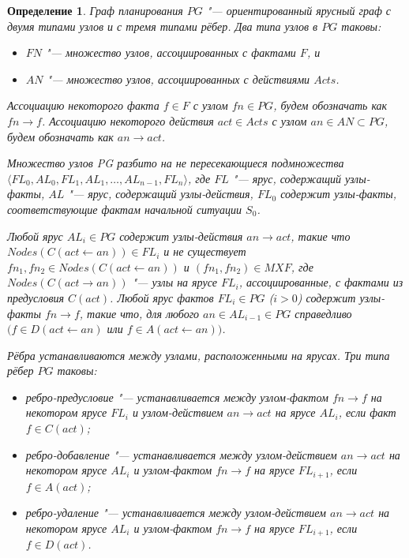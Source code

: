 \documentclass[b5paper,11pt]{book}
\newtheorem{Def}{Определение}
\begin{document}
	\begin{Def}
		Граф планирования $PG$ "--- ориентированный ярусный граф с двумя типами узлов и с тремя типами рёбер.	Два типа узлов в $PG$ таковы: 
		\begin{itemize}
			\item $FN$ "--- множество узлов, ассоциированных с фактами $F$, и 
			\item $AN$ "--- множество узлов, ассоциированных с действиями $Acts$.
		\end{itemize}

		Ассоциацию некоторого факта $f\in F$ с узлом $fn\in PG$, будем обозначать как $fn\rightarrow f$. Ассоциацию некоторого действия $act\in Acts$ с узлом $an\in AN\subset PG$, будем обозначать как $an\rightarrow act$.
		
		Множество узлов PG разбито на не пересекающиеся подмножества $\langle FL_0, AL_0, FL_1, AL_1, \dots, AL_{n-1}, FL_n\rangle$, где $FL$ "--- ярус, содержащий узлы-факты, $AL$ "--- ярус, содержащий узлы-действия, $FL_0$ содержит узлы-факты, соответствующие фактам начальной ситуации $S_0$.
		
		Любой ярус $AL_i\in PG$ содержит узлы-действия $an\rightarrow act$, такие что $Nodes(C(act\leftarrow an))\in FL_i$ и не существует $fn_1,fn_2\in Nodes(C(act\leftarrow an))$ и $(fn_1, fn_2)\in MXF$, где $Nodes(C(act\rightarrow an))$ "--- узлы на ярусе $FL_i$, ассоциированные, с фактами из предусловия $C(act)$. Любой ярус фактов $FL_i\in PG$ ($i>0$) содержит узлы-факты $fn\rightarrow f$, такие что, для любого $an\in AL_{i-1}\in PG$ справедливо $(f\in D(act\leftarrow an)$ или $f\in A(act\leftarrow an))$.
		
		Рёбра устанавливаются между узлами, расположенными на ярусах. Три типа рёбер $PG$ таковы:
		\begin{itemize}
			\item ребро-предусловие "--- устанавливается между узлом-фактом $fn\rightarrow f$ на некотором ярусе $FL_i$ и узлом-действием $an\rightarrow act$ на ярусе $AL_i$, если факт $f\in C(act)$;
			\item ребро-добавление "--- устанавливается между узлом-действием $an\rightarrow act$ на некотором ярусе $AL_i$ и узлом-фактом $fn\rightarrow f$ на ярусе $FL_{i+1}$, если $f\in A(act)$;
			\item ребро-удаление "--- устанавливается между узлом-действием $an\rightarrow act$ на некотором ярусе $AL_i$ и узлом-фактом $fn\rightarrow f$ на ярусе $FL_{i+1}$, если $f\in D(act)$.
		\end{itemize}
	\end{Def}
\end{document}
